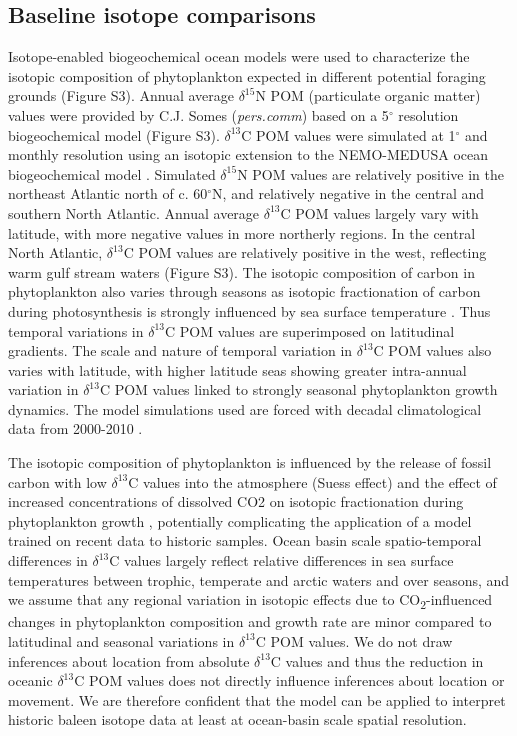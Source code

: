 \documentclass[a4paper,12pt]{article}
\begin{document}
\subsection{Baseline isotope comparisons}
\label{baseline-isotope-comparisons}

Isotope-enabled biogeochemical ocean models \citep{magozzi2017using,schmittner2016complementary} were used to characterize the isotopic composition of phytoplankton expected in different potential foraging grounds (Figure S3). 
Annual average \(\delta^{15}\)N POM (particulate organic matter) values were provided by C.J. Somes (\textit{pers.comm}) based on a 5\({}^{\circ}\) resolution biogeochemical model (Figure S3). 
\(\delta^{13}\)C POM values were simulated at 1\({}^{\circ}\) and monthly resolution using an isotopic extension to the NEMO-MEDUSA ocean biogeochemical model \citep{magozzi2017using,yool2013medusa}. 
Simulated \(\delta^{15}\)N POM values are relatively positive in the northeast Atlantic north of c. 60\({}^{\circ}\)N, and relatively negative in the central and southern North Atlantic. 
Annual average \(\delta^{13}\)C POM values largely vary with latitude, with more negative values in more northerly regions. 
In the central North Atlantic, \(\delta^{13}\)C POM values are relatively positive in the west, reflecting warm gulf stream waters (Figure S3). 
The isotopic composition of carbon in phytoplankton also varies through seasons as isotopic fractionation of carbon during photosynthesis is strongly influenced by sea surface temperature \citep{magozzi2017using,laws1995dependence}. 
Thus temporal variations in \(\delta^{13}\)C POM values are superimposed on latitudinal gradients. 
The scale and nature of temporal variation in \(\delta^{13}\)C POM values also varies with latitude, with higher latitude seas showing greater intra-annual variation in \(\delta^{13}\)C POM values linked to strongly seasonal phytoplankton growth dynamics.
The model simulations used are forced with decadal climatological data from 2000-2010 \citep{magozzi2017using}. 

The isotopic composition of phytoplankton is influenced by the release of fossil carbon with low \(\delta^{13}\)C values into the atmosphere (Suess effect) and the effect of increased concentrations of dissolved CO2 on isotopic fractionation during phytoplankton growth \citep{young2013}, potentially complicating the application of a model trained on recent data to historic samples. 
Ocean basin scale spatio-temporal differences in \(\delta^{13}\)C values largely reflect relative differences in sea surface temperatures between trophic, temperate and arctic waters and over seasons, and we assume that any regional variation in isotopic effects due to CO\textsubscript{2}-influenced changes in phytoplankton composition and growth rate are minor compared to latitudinal and seasonal variations in \(\delta^{13}\)C POM values. 
We do not draw inferences about location from absolute \(\delta^{13}\)C values and thus the reduction in oceanic \(\delta^{13}\)C POM values does not directly influence inferences about location or movement.  
We are therefore confident that the \cite{magozzi2017using} model can be applied to interpret historic baleen isotope data at least at ocean-basin scale spatial resolution.
\end{document}
